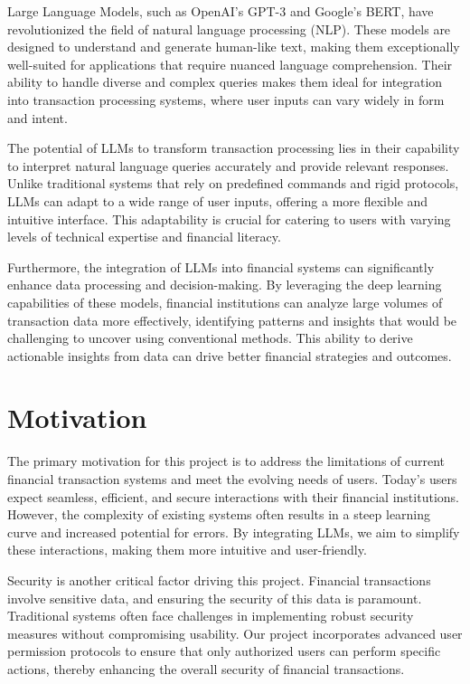 \noindent Large Language Models, such as OpenAI's GPT-3 and Google's BERT, have revolutionized the field of natural language processing (NLP). These models are designed to understand and generate human-like text, making them exceptionally well-suited for applications that require nuanced language comprehension. Their ability to handle diverse and complex queries makes them ideal for integration into transaction processing systems, where user inputs can vary widely in form and intent.

\noindent The potential of LLMs to transform transaction processing lies in their capability to interpret natural language queries accurately and provide relevant responses. Unlike traditional systems that rely on predefined commands and rigid protocols, LLMs can adapt to a wide range of user inputs, offering a more flexible and intuitive interface. This adaptability is crucial for catering to users with varying levels of technical expertise and financial literacy.

\noindent Furthermore, the integration of LLMs into financial systems can significantly enhance data processing and decision-making. By leveraging the deep learning capabilities of these models, financial institutions can analyze large volumes of transaction data more effectively, identifying patterns and insights that would be challenging to uncover using conventional methods. This ability to derive actionable insights from data can drive better financial strategies and outcomes.

\clearpage

\section{Motivation}

\noindent The primary motivation for this project is to address the limitations of current financial transaction systems and meet the evolving needs of users. Today's users expect seamless, efficient, and secure interactions with their financial institutions. However, the complexity of existing systems often results in a steep learning curve and increased potential for errors. By integrating LLMs, we aim to simplify these interactions, making them more intuitive and user-friendly.


\noindent Security is another critical factor driving this project. Financial transactions involve sensitive data, and ensuring the security of this data is paramount. Traditional systems often face challenges in implementing robust security measures without compromising usability. Our project incorporates advanced user permission protocols to ensure that only authorized users can perform specific actions, thereby enhancing the overall security of financial transactions.

